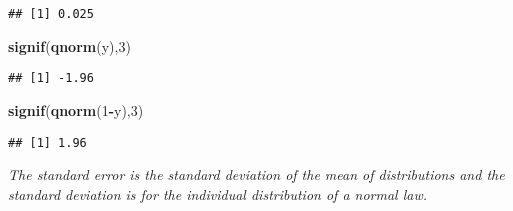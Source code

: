 \documentclass[
]{article}
\newenvironment{Shaded}{\begin{snugshade}}{\end{snugshade}}
\newcommand{\DecValTok}[1]{\textcolor[rgb]{0.00,0.00,0.81}{#1}}
\newcommand{\FloatTok}[1]{\textcolor[rgb]{0.00,0.00,0.81}{#1}}
\newcommand{\FunctionTok}[1]{\textcolor[rgb]{0.13,0.29,0.53}{\textbf{#1}}}
\newcommand{\NormalTok}[1]{#1}
\newcommand{\OtherTok}[1]{\textcolor[rgb]{0.56,0.35,0.01}{#1}}
\newcommand{\SpecialCharTok}[1]{\textcolor[rgb]{0.81,0.36,0.00}{\textbf{#1}}}
\newcommand{\StringTok}[1]{\textcolor[rgb]{0.31,0.60,0.02}{#1}}
\begin{document}
\begin{verbatim}
## [1] 0.025
\end{verbatim}

\begin{Shaded}
\begin{Highlighting}[]
\FunctionTok{signif}\NormalTok{(}\FunctionTok{qnorm}\NormalTok{(y),}\DecValTok{3}\NormalTok{)}
\end{Highlighting}
\end{Shaded}

\begin{verbatim}
## [1] -1.96
\end{verbatim}

\begin{Shaded}
\begin{Highlighting}[]
\FunctionTok{signif}\NormalTok{(}\FunctionTok{qnorm}\NormalTok{(}\DecValTok{1}\SpecialCharTok{{-}}\NormalTok{y),}\DecValTok{3}\NormalTok{)}
\end{Highlighting}
\end{Shaded}

\begin{verbatim}
## [1] 1.96
\end{verbatim}

\emph{The standard error is the standard deviation of the mean of
distributions and the standard deviation is for the individual
distribution of a normal law.}

\begin{Shaded}
\end{Shaded}
\end{document}

